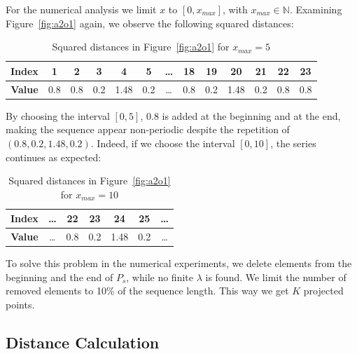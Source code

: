 \documentclass[11pt]{article}
\theoremstyle{remark}
\begin{document}
%
For the numerical analysis we limit $x$ to $[0, x_{max}]$, with $x_{max} \in \mathbb{N}$.
%
Examining Figure~\ref{fig:a2o1} again, we observe the following squared distances:
%
\begin{table}[htbp]
\centering
\begin{tabular}{| c | c || c | c | c | c | c | c | c | c | c | c || c |}
    \hline
    \textbf{Index} &   1 &   2 &   3 &    4 &   5 & \dots &  18 &  19 &   20 &  21 &  22 &  23 \\ \hline
    \textbf{Value} & 0.8 & 0.8 & 0.2 & 1.48 & 0.2 & \dots & 0.8 & 0.2 & 1.48 & 0.2 & 0.8 & 0.8 \\ \hline
\end{tabular}
\caption{Squared distances in Figure~\ref{fig:a2o1} for $x_{max} = 5$}
\label{tab:distances1}
\end{table}

By choosing the interval $[0, 5]$, $0.8$ is added at the beginning and at the end, making the sequence appear non-periodic despite the repetition of $(0.8, 0.2, 1.48, 0.2)$. Indeed, if we choose the interval $[0, 10]$, the series continues as expected:
%
\begin{table}[htbp]
\centering
  \begin{tabular}{| c | c | c | c | c | c | c |}
    \hline
    \textbf{Index} & \dots &  22 &  23 &   24 &  25 & \dots \\ \hline
    \textbf{Value} & \dots & 0.8 & 0.2 & 1.48 & 0.2 & \dots \\ \hline
  \end{tabular}
\caption{Squared distances in Figure~\ref{fig:a2o1} for $x_{max} = 10$}
\label{tab:distances2}
\end{table}

To solve this problem in the numerical experiments, we delete elements from the beginning and the end of $P_s$, while no finite $\lambda$ is found. We limit the number of removed elements to 10\% of the sequence length.
%
This way we get $K$ projected points.

\subsection{Distance Calculation}
\end{document}
